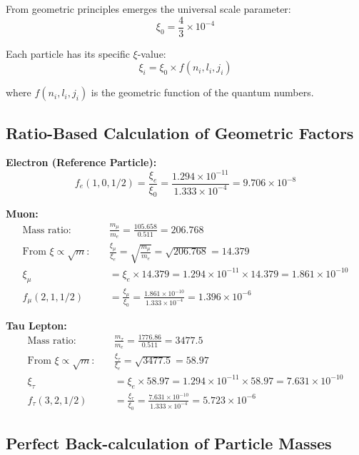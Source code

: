 \documentclass[12pt,a4paper]{article}
\begin{document}
	From geometric principles emerges the universal scale parameter:
	\begin{equation}
		\xi_0 = \frac{4}{3} \times 10^{-4}
	\end{equation}
	
	Each particle has its specific $\xi$-value:
	\begin{equation}
		\xi_i = \xi_0 \times f(n_i, l_i, j_i)
	\end{equation}
	
	where $f(n_i, l_i, j_i)$ is the geometric function of the quantum numbers.
	
	\subsection{Ratio-Based Calculation of Geometric Factors}
	
	\textbf{Electron (Reference Particle):}
	\begin{equation}
		f_e(1,0,1/2) = \frac{\xi_e}{\xi_0} = \frac{1.294 \times 10^{-11}}{1.333 \times 10^{-4}} = 9.706 \times 10^{-8}
	\end{equation}
	
	\textbf{Muon:}
	\begin{align}
		\text{Mass ratio:} \quad &\frac{m_\mu}{m_e} = \frac{105.658}{0.511} = 206.768\\
		\text{From } \xi \propto \sqrt{m}: \quad &\frac{\xi_\mu}{\xi_e} = \sqrt{\frac{m_\mu}{m_e}} = \sqrt{206.768} = 14.379\\
		\xi_\mu &= \xi_e \times 14.379 = 1.294 \times 10^{-11} \times 14.379 = 1.861 \times 10^{-10}\\
		f_\mu(2,1,1/2) &= \frac{\xi_\mu}{\xi_0} = \frac{1.861 \times 10^{-10}}{1.333 \times 10^{-4}} = 1.396 \times 10^{-6}
	\end{align}
	
	\textbf{Tau Lepton:}
	\begin{align}
		\text{Mass ratio:} \quad &\frac{m_\tau}{m_e} = \frac{1776.86}{0.511} = 3477.5\\
		\text{From } \xi \propto \sqrt{m}: \quad &\frac{\xi_\tau}{\xi_e} = \sqrt{3477.5} = 58.97\\
		\xi_\tau &= \xi_e \times 58.97 = 1.294 \times 10^{-11} \times 58.97 = 7.631 \times 10^{-10}\\
		f_\tau(3,2,1/2) &= \frac{\xi_\tau}{\xi_0} = \frac{7.631 \times 10^{-10}}{1.333 \times 10^{-4}} = 5.723 \times 10^{-6}
	\end{align}
	
	\subsection{Perfect Back-calculation of Particle Masses}
	
\end{document}
